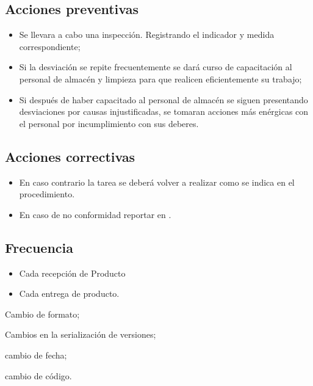 \subsection{Acciones preventivas}

\begin{itemize}
	\item Se llevara a cabo una inspección. Registrando el indicador y medida correspondiente;
	\item Si la desviación se repite frecuentemente se dará curso de capacitación al personal de almacén y limpieza para que realicen eficientemente su trabajo;
	\item Si después de haber capacitado al personal de almacén se siguen presentando desviaciones por causas injustificadas, se tomaran acciones más enérgicas con el personal por incumplimiento con sus deberes.
\end{itemize}

\subsection{Acciones correctivas}

\begin{itemize}
	\item En caso contrario la tarea se deberá volver a realizar como se indica en el procedimiento.
	\item En caso de no conformidad reportar en \RAC.
\end{itemize}

\subsection{Frecuencia}

\begin{itemize}
	\item Cada recepción de Producto
	\item Cada entrega de producto.
\end{itemize}

\begin{changelog}[simple, sectioncmd=\subsection*,label=changelog-2.2]
	
	\begin{version}[v=2.1, date=2023--01, author=Pablo E. Alanis]
			\item Cambio de formato;
			\item Cambios en la serialización de versiones;
	\end{version}

	\begin{version}[v=1.3, date=2022--05, author=Alonso M.]
		\item cambio de fecha;
		\item cambio de código.
	\end{version}

\end{changelog}